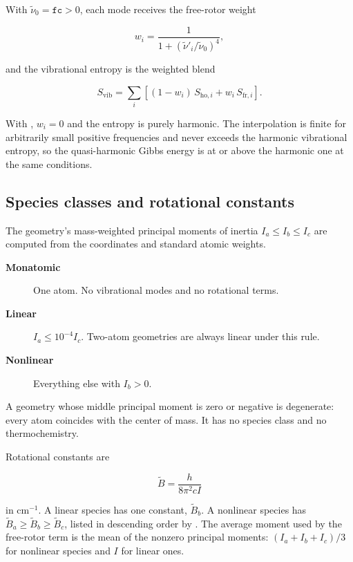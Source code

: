 With $\tilde{\nu}_0 = \texttt{fc} > 0$, each mode receives the free-rotor
weight

\begin{equation}
w_i = \frac{1}{1 + (\tilde{\nu}'_i/\tilde{\nu}_0)^4},
\end{equation}

and the vibrational entropy is the weighted blend

\begin{equation}
S_{\mathrm{vib}} = \sum_i \left[(1-w_i)\,S_{\mathrm{ho},i}
                                  + w_i\,S_{\mathrm{fr},i}\right].
\end{equation}

With , $w_i = 0$ and the entropy is purely harmonic. The
interpolation is finite for arbitrarily small positive frequencies and never
exceeds the harmonic vibrational entropy, so the quasi-harmonic Gibbs energy
is at or above the harmonic one at the same conditions.

\subsection{Species classes and rotational constants}\label{sec:species}

The geometry's mass-weighted principal moments of inertia $I_a \le I_b \le
I_c$ are computed from the coordinates and standard atomic weights.

\begin{description}
  \item[\textbf{Monatomic}] One atom. No vibrational modes and no rotational
        terms.
  \item[\textbf{Linear}] $I_a \le 10^{-4} I_c$. Two-atom geometries are
        always linear under this rule.
  \item[\textbf{Nonlinear}] Everything else with $I_b > 0$.
\end{description}

A geometry whose middle principal moment is zero or negative is degenerate:
every atom coincides with the center of mass. It has no species class and no
thermochemistry.

Rotational constants are

\begin{equation}
\tilde{B} = \frac{h}{8\pi^2 c I}
\end{equation}

in cm$^{-1}$. A linear species has one constant, $\tilde{B}_b$. A nonlinear
species has $\tilde{B}_a \ge \tilde{B}_b \ge \tilde{B}_c$, listed in
descending order by . The average moment used by the free-rotor
term is the mean of the nonzero principal moments:
$(I_a+I_b+I_c)/3$ for nonlinear species and $I$ for linear ones.

